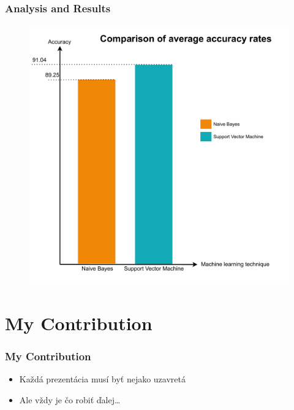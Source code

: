 \documentclass{beamer}
\begin{document}
\begin{frame}[fragile=singleslide]\frametitle{Analysis and Results}
\begin{figure}
\centering
\includegraphics[scale=.35]{average_accuracy.pdf}
\end{figure}
\end{frame}

\section{My Contribution}

\begin{frame}[fragile=singleslide]\frametitle{My Contribution}
\begin{itemize}
\item Každá prezentácia musí byť nejako uzavretá
\item Ale vždy je čo robiť ďalej\ldots{}
\end{itemize}
\end{frame}
\end{document}
